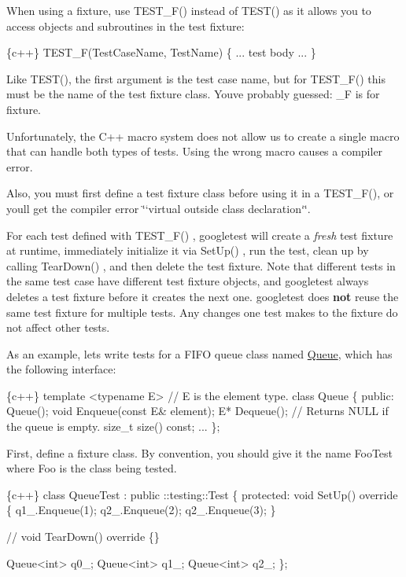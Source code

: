 When using a fixture, use {\ttfamily T\+E\+S\+T\+\_\+\+F()} instead of {\ttfamily T\+E\+S\+T()} as it allows you to access objects and subroutines in the test fixture\+:


\begin{DoxyCode}
\{c++\}
TEST\_F(TestCaseName, TestName) \{
  ... test body ...
\}
\end{DoxyCode}


Like {\ttfamily T\+E\+S\+T()}, the first argument is the test case name, but for {\ttfamily T\+E\+S\+T\+\_\+\+F()} this must be the name of the test fixture class. You\textquotesingle{}ve probably guessed\+: {\ttfamily \+\_\+F} is for fixture.

Unfortunately, the C++ macro system does not allow us to create a single macro that can handle both types of tests. Using the wrong macro causes a compiler error.

Also, you must first define a test fixture class before using it in a {\ttfamily T\+E\+S\+T\+\_\+\+F()}, or you\textquotesingle{}ll get the compiler error \char`\"{}`virtual outside class
declaration`\char`\"{}.

For each test defined with {\ttfamily T\+E\+S\+T\+\_\+\+F()} , googletest will create a {\itshape fresh} test fixture at runtime, immediately initialize it via {\ttfamily Set\+Up()} , run the test, clean up by calling {\ttfamily Tear\+Down()} , and then delete the test fixture. Note that different tests in the same test case have different test fixture objects, and googletest always deletes a test fixture before it creates the next one. googletest does {\bfseries not} reuse the same test fixture for multiple tests. Any changes one test makes to the fixture do not affect other tests.

As an example, let\textquotesingle{}s write tests for a F\+I\+FO queue class named {\ttfamily \hyperlink{classQueue}{Queue}}, which has the following interface\+:


\begin{DoxyCode}
\{c++\}
template <typename E>  // E is the element type.
class Queue \{
 public:
  Queue();
  void Enqueue(const E& element);
  E* Dequeue();  // Returns NULL if the queue is empty.
  size\_t size() const;
  ...
\};
\end{DoxyCode}


First, define a fixture class. By convention, you should give it the name {\ttfamily Foo\+Test} where {\ttfamily Foo} is the class being tested.


\begin{DoxyCode}
\{c++\}
class QueueTest : public ::testing::Test \{
 protected:
  void SetUp() override \{
     q1\_.Enqueue(1);
     q2\_.Enqueue(2);
     q2\_.Enqueue(3);
  \}

  // void TearDown() override \{\}

  Queue<int> q0\_;
  Queue<int> q1\_;
  Queue<int> q2\_;
\};
\end{DoxyCode}


